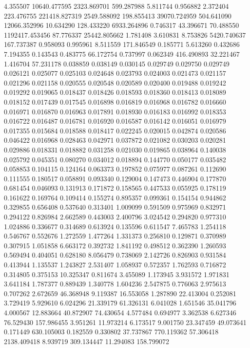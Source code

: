 4.355507
10640.477595
2323.869701
599.287988
5.811744
0.956882
2.372404
223.476755
221418.827319
2549.588092
198.855413
39070.724959
504.641090
12066.352996
10.634290
128.433220
6933.264896
0.746317
43.396671
70.488550
1192417.453456
87.776337
25442.805662
1.781408
3.610831
8.753826
5420.740637
167.737387
0.958093
0.995961
8.511559
171.846549
0.185771
5.613260
0.432686
7.194355
0.143543
0.483775
66.172754
0.737997
0.062349
416.490893
32.221467
1.416704
57.231178
0.038859
0.038149
0.030145
0.029749
0.029750
0.029749
0.026121
0.025077
0.025103
0.024648
0.023793
0.024003
0.021473
0.021157
0.021296
0.021158
0.020555
0.020548
0.020589
0.020400
0.019488
0.019242
0.019292
0.019065
0.018437
0.018426
0.018593
0.018360
0.018413
0.018089
0.018152
0.017439
0.017545
0.016898
0.016819
0.016968
0.016782
0.016660
0.016971
0.016870
0.016963
0.017891
0.018930
0.016183
0.016992
0.018353
0.016722
0.016487
0.016781
0.016920
0.016587
0.016142
0.016051
0.016979
0.017355
0.015684
0.018588
0.018417
0.022245
0.020015
0.042874
0.020586
0.046422
0.016968
0.028463
0.042971
0.037872
0.021082
0.030203
0.020281
0.029886
0.018331
0.018882
0.031258
0.021030
0.019865
0.038964
0.140038
0.025792
0.045351
0.080270
0.034012
0.018894
0.144770
0.050177
0.035482
0.058853
0.104115
0.124164
0.063373
0.197852
0.075977
0.087261
0.112690
0.111555
0.180517
0.058891
0.093340
0.129004
0.147473
0.446904
0.177870
0.681454
0.046093
0.131913
0.171872
0.158565
0.447533
0.055925
0.178119
0.161622
0.169764
0.109414
0.155274
0.895357
0.099361
0.154154
0.944862
0.329855
0.656408
0.537640
0.313401
1.009099
0.591509
0.975969
0.832971
0.294122
0.826984
2.662589
0.443003
2.400796
3.024542
0.294820
0.977310
1.024886
0.336677
0.314689
0.613924
0.135596
0.611547
7.465783
1.254118
0.546767
0.552676
1.272559
1.477264
1.331373
0.256810
0.129871
0.370989
0.307915
1.051858
6.663172
0.392732
1.841192
0.498512
0.362390
1.260593
0.569494
0.404051
0.628180
8.056479
0.738069
2.142726
0.826903
0.931584
0.413944
1.135537
1.243827
2.531407
1.058937
0.572357
1.762593
0.716872
0.314805
0.375153
10.325347
0.811674
3.455089
1.173945
3.931572
1.971831
3.641184
1.787377
0.889439
1.340778
1.604236
2.547875
0.776063
2.975613
0.707262
2.672659
46.368948
9.119387
16.553058
1.287890
22.413004
0.252081
3.729419
5.929610
6.024296
21.339179
61.326131
6.041028
1.651546
35.041796
4.000567
12.883664
40.872907
74.430654
4.577484
0.694977
3.362538
6.627346
76.529430
157.986455
3.951261
11.973214
6.173517
9.001750
23.347459
49.073641
0.171449
630.105003
0.182559
0.330802
37.737867
770.119362
57.306418
2138.409418
8.939719
309.134447
11.294083
158.799072
